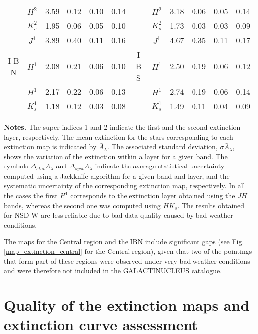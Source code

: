 \documentclass{aa}
\begin{document}
\begin{table*}[t!]
\begin{center}
\begin{tabular}{cccccc|cccccc}
 & $H^{2}$  & 3.59  & 0.12  & 0.10  & 0.14 &  & $H^{2}$  & 3.18  & 0.06  & 0.05  & 0.14\tabularnewline
 & $K_{s}^{2}$  & 1.95  & 0.06  & 0.05  & 0.10  &  & $K_{s}^{2}$  & 1.73  & 0.03  & 0.03  & 0.09\tabularnewline
\hline 
 & $J^{1}$  & 3.89  & 0.40  & 0.11  & 0.16  &  & $J^{1}$  & 4.67  & 0.35  &0.11  & 0.17\tabularnewline
I B N  & $H^{1}$  & 2.08  & 0.21  & 0.06  & 0.10  & I B S  & $H^{1}$  & 2.50  & 0.19  & 0.06  & 0.12\tabularnewline
 & $H^{1}$  & 2.17  & 0.22  & 0.06  & 0.13  &  & $H^{1}$  & 2.74  & 0.19  & 0.06  & 0.14\tabularnewline
 & $K_{s}^{1}$  & 1.18  & 0.12  & 0.03  & 0.08  &  & $K_{s}^{1}$  & 1.49  & 0.11  & 0.04  & 0.09\tabularnewline
\hline 
\end{tabular}


\end{center}
\footnotesize
\textbf{Notes.} The super-indices 1 and 2 indicate the first and the second extinction layer, respectively. The mean extinction for the stars corresponding to each extinction map is indicated by $\bar{A}_\lambda$. The associated standard deviation, $\sigma \bar{A}_\lambda$, shows the variation of the extinction within a layer for a given band. The symbols $\Delta_{stat} \bar{A}_\lambda$ and $\Delta_{syst} \bar{A}_\lambda$ indicate the average statistical uncertainty computed using a Jackknife algorithm for a given band and layer, and the systematic uncertainty of the corresponding extinction map, respectively. In all the cases the first $H^1$ corresponds to the extinction layer obtained using the $JH$ bands, whereas the second one was computed using $HK_s$. The results obtained for NSD W are less reliable due to bad data quality caused by bad weather conditions.

 \end{table*}

The maps for the Central region and the IBN include significant gaps (see Fig. \ref{map_extinction_central} for the Central region), given that two of the pointings that form part of these regions were observed under very bad weather conditions and were therefore not included in the GALACTINUCLEUS catalogue.



\section{Quality of the extinction maps and extinction curve assessment}

\end{document}
